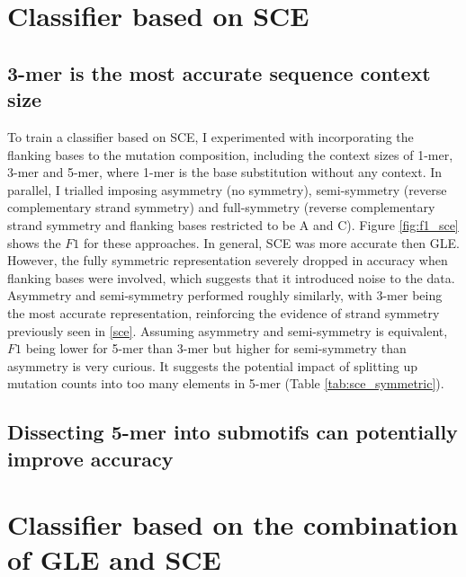 

\newpage
\section{Classifier based on SCE}\label{ml:sce}

\subsection{3-mer is the most accurate sequence context size}
To train a classifier based on SCE, I experimented with incorporating the flanking bases to the mutation composition, including the context sizes of 1-mer, 3-mer and 5-mer, where 1-mer is the base substitution without any context. In parallel, I trialled imposing asymmetry (no symmetry), semi-symmetry (reverse complementary strand symmetry) and full-symmetry (reverse complementary strand symmetry and flanking bases restricted to be A and C). Figure \ref{fig:f1_sce} shows the $F1$ for these approaches. In general, SCE was more accurate then GLE. However, the fully symmetric representation severely dropped in accuracy when flanking bases were involved, which suggests that it introduced noise to the data. Asymmetry and semi-symmetry performed roughly similarly, with 3-mer being the most accurate representation, reinforcing the evidence of strand symmetry previously seen in \ref{sce}. Assuming asymmetry and semi-symmetry is equivalent, $F1$ being lower for 5-mer than 3-mer but higher for semi-symmetry than asymmetry is very curious. It suggests the potential impact of splitting up mutation counts into too many elements in 5-mer (Table \ref{tab:sce_symmetric}).



\subsection{Dissecting 5-mer into submotifs can potentially improve accuracy}



\section{Classifier based on the combination of GLE and SCE}\label{ml:both}